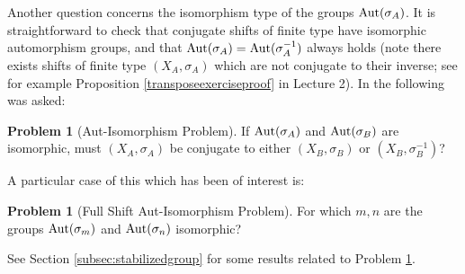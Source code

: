 \documentclass{amsart}
\newcommand{\si}{\index}
\theoremstyle{definition}
\newtheorem{prob}[equation]{Problem}
\theoremstyle{definition}
\newcommand{\aut}{\textnormal{Aut}}
\numberwithin{equation}{subsection}
\begin{document}
Another question concerns the isomorphism type of the groups $\aut(\sigma_{A})$. It is straightforward to check that conjugate shifts of finite type have isomorphic automorphism groups\si{automorphism group}, and that $\aut(\sigma_{A}) = \aut(\sigma_{A}^{-1})$ always holds (note there exists shifts of finite type $(X_{A},\sigma_{A})$ which are not conjugate to their inverse; see for example Proposition \ref{transposeexerciseproof} in Lecture 2). In \cite[Question 4.1]{BLR88} the following was asked:

\begin{prob}[Aut-Isomorphism Problem]\label{prob:autoisoproblem}
If $\aut(\sigma_{A})$ and $\aut(\sigma_{B})$ are isomorphic, must $(X_{A},\sigma_{A})$ be conjugate to either $(X_{B},\sigma_{B})$ or $(X_{B},\sigma_{B}^{-1})$?
\end{prob}

A particular case of this which has been of interest is:

\begin{prob}[Full Shift Aut-Isomorphism Problem]\label{prob:fullshiftautisoproblem}
For which $m,n$ are the groups $\aut(\sigma_{m})$ and $\aut(\sigma_{n})$ isomorphic?
\end{prob}

See Section \ref{subsec:stabilizedgroup} for some results related to Problem \ref{prob:fullshiftautisoproblem}.
\end{document}
